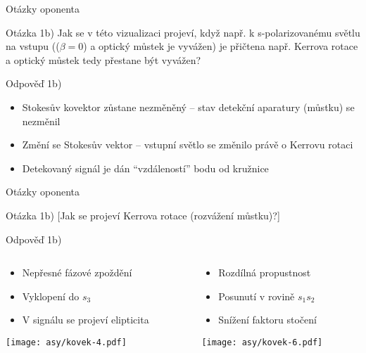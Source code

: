 \begin{frame}{Otázky oponenta}
    \begin{block}{Otázka 1b)}
        Jak se v této vizualizaci projeví, když např. k s-polarizovanému světlu na vstupu (($\beta=0$) a optický můstek je vyvážen) je přičtena např. Kerrova rotace a optický můstek tedy přestane být vyvážen?
    \end{block}
    \begin{exampleblock}{Odpověď 1b)}
        \begin{itemize}
            \item Stokesův kovektor zůstane nezměněný -- stav detekční aparatury (můstku) se nezměnil
            \item Změní se Stokesův vektor -- vstupní světlo se změnilo právě o Kerrovu rotaci
            \item Detekovaný signál je dán ``vzdáleností'' bodu od kružnice
        \end{itemize}
    \end{exampleblock}
\end{frame}

\begin{frame}{Otázky oponenta}
    \begin{block}{Otázka 1b)}
        [Jak se projeví Kerrova rotace (rozvážení můstku)?]
    \end{block}
    
    \begin{exampleblock}{Odpověď 1b)}
        \begin{columns}
            \begin{column}{0.5\textwidth}
                \begin{itemize}
                    \item Nepřesné fázové zpoždění
                    \item Vyklopení do $s_3$ 
                    \item V signálu se projeví elipticita
                \end{itemize} 
                \texttt{[image: asy/kovek-4.pdf]}
            \end{column}
            \begin{column}{0.5\textwidth}
                \begin{itemize}
                    \item Rozdílná propustnost
                    \item Posunutí v rovině $s_1s_2$
                    \item Snížení faktoru stočení
                \end{itemize} 
                \texttt{[image: asy/kovek-6.pdf]}
            \end{column}
        \end{columns}
    \end{exampleblock}
\end{frame}


